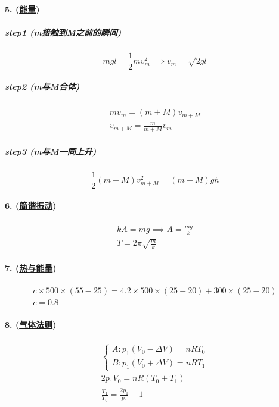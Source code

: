 \paragraph{5. (\hyperref[subsec:能量]{能量})}

\subparagraph{step1 (m接触到M之前的瞬间)}

\begin{equation*}
    mgl=\frac12mv_m^2\implies
    v_m=\sqrt{2gl}
\end{equation*}

\subparagraph{step2 (m与M合体)}

\begin{gather*}
    mv_m=(m+M)v_{m+M}\\
    v_{m+M}=\frac{m}{m+M}v_m
\end{gather*}

\subparagraph{step3 (m与M一同上升)}

\begin{equation*}
    \frac12(m+M)v_{m+M}^2=(m+M)gh
\end{equation*}

\paragraph{6. (\hyperref[subsec:简谐振动]{简谐振动})}

\begin{gather*}
    kA=mg\implies A=\frac{mg}{k}\\
    T=2\pi\sqrt{\frac{m}{k}}
\end{gather*}

\paragraph{7. (\hyperref[sec:热与能量]{热与能量})}

\begin{gather*}
    c\times500\times(55-25)=4.2\times500\times(25-20)+300\times(25-20)\\
    c=0.8
\end{gather*}

\paragraph{8. (\hyperref[subsec:气体法则]{气体法则})}

\begin{gather*}
    \begin{cases}
        A: p_1(V_0-\Delta V)=nRT_0\\
        B: p_1(V_0+\Delta V)=nRT_1
    \end{cases}\\
    2p_1V_0=nR(T_0+T_1)\\
    \frac{T_1}{T_0}=\frac{2p_1}{p_0}-1
\end{gather*}

